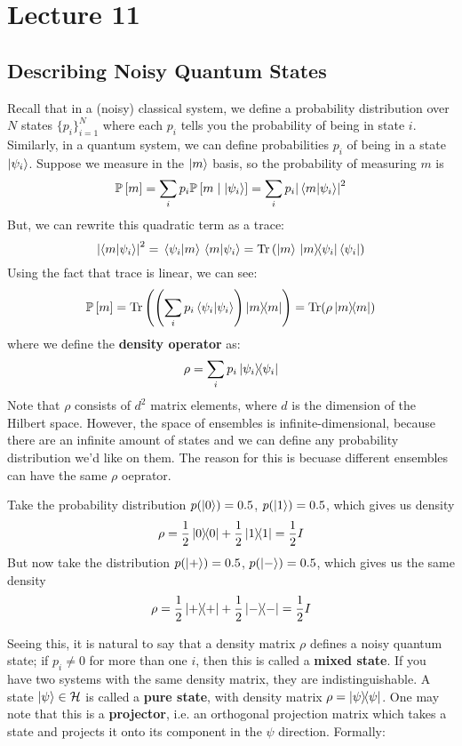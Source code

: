 \section{Lecture 11}

\subsection{Describing Noisy Quantum States}
Recall that in a (noisy) classical system, we define a probability distribution over $N$ states
$\{p_i\}_{i = 1}^N$ where each $p_i$ tells you the probability of being in state $i$. Similarly, in a quantum system,
we can define probabilities $p_i$ of being in a state $\ket{\psi_i}$. Suppose we measure in the $\ket{m}$
basis, so the probability of measuring $m$ is
\[ \mathbb{P}\left[ m \right] = \sum_i p_i \mathbb{P}\left[ m \mid \ket{\psi_i} \right] = \sum_i p_i \qty|\braket*{m}{\psi_i}|^2 \]
But, we can rewrite this quadratic term as a trace:
\[ \abs{\braket{m}{\psi_i}}^2 = \braket*{\psi_i}{m}\braket*{m}{\psi_i} = \Tr\left(\ket{m}\ketbra*{m}{\psi_i} \bra{\psi_i}\right) \]
Using the fact that trace is linear, we can see:
\[ \mathbb{P}\left[ m \right] = \Tr\qty(\qty(\sum_i p_i \braket{\psi_i}{\psi_i}) \ketbra{m}{m}) = \Tr(\rho \ketbra{m}{m})\]
where we define the \textbf{density operator} as:
\[ \rho = \sum_i p_i \ketbra{\psi_i}{\psi_i} \]
Note that $\rho$ consists of $d^2$ matrix elements, where $d$ is the dimension of the Hilbert space.
However, the space of ensembles is infinite-dimensional, because there are an infinite amount of states
and we can define any probability distribution we'd like on them.
The reason for this is becuase different ensembles can have the same $\rho$ oeprator.

\begin{example}
    Take the probability distribution $p(\ket{0}) = 0.5$, $p(\ket{1}) = 0.5$, which gives us density
    \[ \rho = \frac{1}{2} \ketbra{0}{0} + \frac{1}{2} \ketbra{1}{1} = \frac{1}{2} I \]
    But now take the distribution $p(\ket{+}) = 0.5$, $p(\ket{-}) = 0.5$, which gives us the same density
    \[ \rho = \frac{1}{2} \ketbra{+}{+} + \frac{1}{2} \ketbra{-}{-} = \frac{1}{2} I \]
\end{example}

Seeing this, it is natural to say that a density matrix $\rho$ defines a noisy quantum state; if $p_i \neq 0$ for more than one $i$, then
this is
called a \textbf{mixed state}. If you have two systems
with the same density matrix, they are indistinguishable. A state $\ket{\psi} \in \mathcal{H}$ is called a \textbf{pure state}, with density matrix $\rho = \ketbra{\psi}{\psi}$. One may note that this is a \textbf{projector}, i.e. an orthogonal projection matrix which takes a state and projects it onto its component in the $\psi$ direction. Formally:

